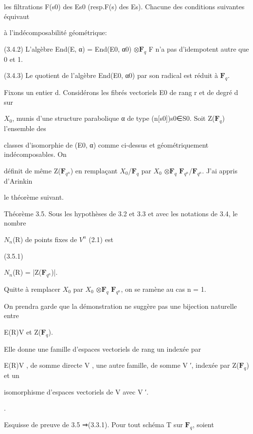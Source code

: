 \documentclass[11pt]{article}
\begin{document}
\noindent les filtrations F(s0) des Es0 (resp.F(s) des Es). Chacune des conditions suivantes équivaut\par
\noindent à l’indécomposabilité géométrique:\par
\noindent (3.4.2) L’algèbre End(E, α) = End(E0, α0) \(\otimes\)\(\mathbf F_q\) F n’a pas d’idempotent autre que 0 et 1.\par
\noindent (3.4.3) Le quotient de l’algèbre End(E0, α0) par son radical est réduit à \(\mathbf F_q\).\par
\noindent Fixons un entier d. Considérons les fibrés vectoriels E0 de rang r et de degré d sur\par
\noindent \(X_0\), munis d’une structure parabolique α de type (n[s0])s0∈S0. Soit Z(\(\mathbf F_q\)) l’ensemble des\par
\noindent classes d’isomorphie de (E0, α) comme ci-dessus et géométriquement indécomposables. On\par
\noindent définit de même Z(\(\mathbf F_{q^n}\)) en remplaçant \(X_0\)/\(\mathbf F_q\) par \(X_0\) \(\otimes\)\(\mathbf F_q\) \(\mathbf F_{q^n}\)/\(\mathbf F_{q^n}\). J’ai appris d’Arinkin\par
\noindent le théorème suivant.\par
\noindent Théorème 3.5. Sous les hypothèses de 3.2 et 3.3 et avec les notations de 3.4, le nombre\par
\noindent \(N_n\)(R) de points fixes de \(V^n\) (2.1) est\par
\noindent (3.5.1)\par
\noindent \(N_n\)(R) = |Z(\(\mathbf F_{q^n}\))|.\par
\noindent Quitte à remplacer \(X_0\) par \(X_0\) \(\otimes\)\(\mathbf F_q\) \(\mathbf F_{q^n}\), on se ramène au cas n = 1.\par
\medskip
\noindent On prendra garde que la démonstration ne suggère pas une bijection naturelle entre\par
\noindent E(R)V et Z(\(\mathbf F_q\)).\par
\noindent Elle donne une famille d’espaces vectoriels de rang un indexée par\par
\noindent E(R)V , de somme directe V , une autre famille, de somme V ′, indexée par Z(\(\mathbf F_q\)) et un\par
\noindent isomorphisme d’espaces vectoriels de V avec V ′.\par
{}.\par
\noindent Esquisse de preuve de 3.5 ⇒(3.3.1). Pour tout schéma T sur \(\mathbf F_q\), soient\par
\end{document}
